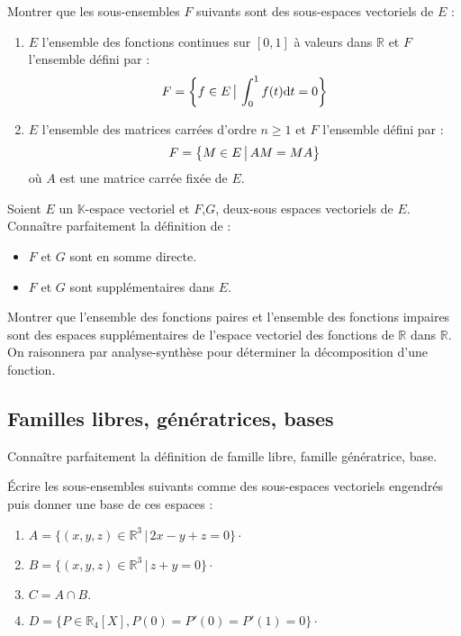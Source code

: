 \documentclass[a4paper,twoside,french,11pt]{VcCours}
\newcommand{\dt}{\text{d}t}
\begin{document}
\begin{Exercice}{}
  Montrer que les sous-ensembles $F$ suivants sont des sous-espaces vectoriels de $E$ :
  
  \begin{enumerate}
    \item $E$ l'ensemble des fonctions continues sur $[0,1]$ à valeurs dans $\mathbb{R}$ et $F$ l'ensemble défini par :
    $$ F = \left\lbrace f \in E \, \big{\vert} \, \int_{0}^1 f(t) \dt =0 \right\rbrace$$
    \item $E$ l'ensemble des matrices carrées d'ordre $n \geq 1$ et $F$ l'ensemble défini par :
    $$  F = \left\lbrace M \in E \, \big{\vert} \, AM=MA \right\rbrace$$
    où $A$ est une matrice carrée fixée de $E$.
  \end{enumerate}
\end{Exercice} 
  
\begin{ptc}{}
	Soient $E$ un $\mathbb{K}$-espace vectoriel et $F$,$G$, deux-sous espaces vectoriels de $E$. Connaître parfaitement la définition de :
\begin{itemize}
\item $F$ et $G$ sont en somme directe.
\item $F$ et $G$ sont supplémentaires dans $E$.
\end{itemize}
\end{ptc}

\begin{Exercice}{}
  Montrer que l'ensemble des fonctions paires et l'ensemble des fonctions impaires sont des espaces supplémentaires de l'espace vectoriel des fonctions de $\mathbb{R}$ dans $\mathbb{R}$. On raisonnera par analyse-synthèse pour déterminer la décomposition d'une fonction.
\end{Exercice} 

\subsection{Familles libres, génératrices, bases}

\begin{ptc}{}
	Connaître parfaitement la définition de famille libre, famille génératrice, base.
\end{ptc}

\begin{Exercice}{}
  Écrire les sous-ensembles suivants comme des sous-espaces vectoriels engendrés puis donner une base de ces espaces :
  
  \begin{enumerate}
    \item $A=\lbrace (x,y,z) \in \mathbb{R}^3 \, \vert  \, 2x-y+z=0 \rbrace \cdot$
    \item $B= \lbrace (x,y,z) \in \mathbb{R}^3 \, \vert \, z+y=0 \rbrace \cdot$
    \item $C= A \cap B.$
    \item $D = \lbrace P \in \mathbb{R}_4[X], P(0)=P'(0)=P'(1)=0 \rbrace \cdot$
  \end{enumerate}
\end{Exercice} 
  
\end{document}
